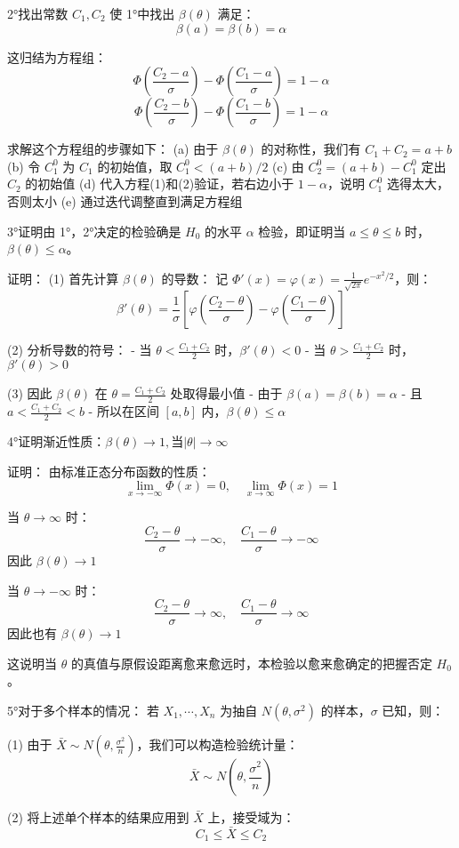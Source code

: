 \documentclass[UTF8]{report}
\theoremstyle{MyLineTheoremStyle} %
\theoremstyle{MyBlockTheoremStyle} %
\theoremstyle{MySubsubsectionStyle} %
\begin{document}
2°找出常数 $C_1,C_2$ 使 1°中找出 $\beta(\theta)$ 满足：
$$\beta(a) = \beta(b) = \alpha$$

这归结为方程组：
$$\Phi\left(\frac{C_2-a}{\sigma}\right)-\Phi\left(\frac{C_1-a}{\sigma}\right)=1-\alpha$$
$$\Phi\left(\frac{C_2-b}{\sigma}\right)-\Phi\left(\frac{C_1-b}{\sigma}\right)=1-\alpha$$

求解这个方程组的步骤如下：
(a) 由于 $\beta(\theta)$ 的对称性，我们有 $C_1+C_2=a+b$
(b) 令 $C_1^0$ 为 $C_1$ 的初始值，取 $C_1^0<(a+b)/2$
(c) 由 $C_2^0=(a+b)-C_1^0$ 定出 $C_2$ 的初始值
(d) 代入方程(1)和(2)验证，若右边小于 $1-\alpha$，说明 $C_1^0$ 选得太大，否则太小
(e) 通过迭代调整直到满足方程组

3°证明由 1°，2°决定的检验确是 $H_0$ 的水平 $\alpha$ 检验，即证明当 $a\leq\theta\leq b$ 时，$\beta(\theta)\leq\alpha$。

证明：
(1) 首先计算 $\beta(\theta)$ 的导数：
记 $\Phi'(x)=\varphi(x)=\frac{1}{\sqrt{2\pi}}e^{-x^2/2}$，则：
$$\beta'(\theta)=\frac{1}{\sigma}\left[\varphi\left(\frac{C_2-\theta}{\sigma}\right)-\varphi\left(\frac{C_1-\theta}{\sigma}\right)\right]$$

(2) 分析导数的符号：
- 当 $\theta<\frac{C_1+C_2}{2}$ 时，$\beta'(\theta)<0$
- 当 $\theta>\frac{C_1+C_2}{2}$ 时，$\beta'(\theta)>0$

(3) 因此 $\beta(\theta)$ 在 $\theta=\frac{C_1+C_2}{2}$ 处取得最小值
- 由于 $\beta(a)=\beta(b)=\alpha$
- 且 $a<\frac{C_1+C_2}{2}<b$
- 所以在区间 $[a,b]$ 内，$\beta(\theta)\leq\alpha$

4°证明渐近性质：$\beta(\theta)\to 1,\text{当}|\theta|\to\infty$

证明：
由标准正态分布函数的性质：
$$\lim_{x\to-\infty}\Phi(x)=0,\quad \lim_{x\to\infty}\Phi(x)=1$$

当 $\theta\to\infty$ 时：
$$\frac{C_2-\theta}{\sigma}\to-\infty,\quad \frac{C_1-\theta}{\sigma}\to-\infty$$
因此 $\beta(\theta)\to 1$

当 $\theta\to-\infty$ 时：
$$\frac{C_2-\theta}{\sigma}\to\infty,\quad \frac{C_1-\theta}{\sigma}\to\infty$$
因此也有 $\beta(\theta)\to 1$

这说明当 $\theta$ 的真值与原假设距离愈来愈远时，本检验以愈来愈确定的把握否定 $H_0$。

5°对于多个样本的情况：
若 $X_1,\cdots,X_n$ 为抽自 $N(\theta,\sigma^2)$ 的样本，$\sigma$ 已知，则：

(1) 由于 $\bar{X}\sim N(\theta,\frac{\sigma^2}{n})$，我们可以构造检验统计量：
$$\bar{X}\sim N(\theta,\frac{\sigma^2}{n})$$

(2) 将上述单个样本的结果应用到 $\bar{X}$ 上，接受域为：
$$C_1\leq\bar{X}\leq C_2$$
\end{document}
